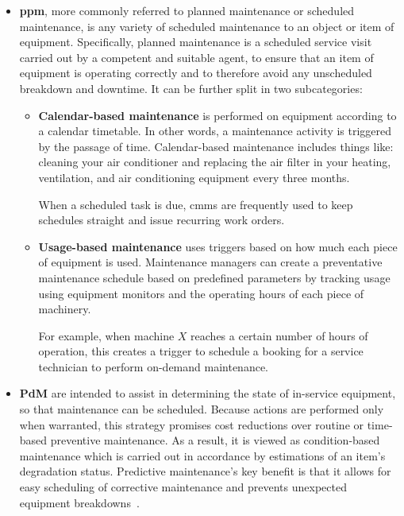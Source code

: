 \begin{itemize}
    \item \textbf{\ac{ppm}}, more commonly referred to planned maintenance
          or scheduled maintenance, is any variety of scheduled maintenance to an object or item of equipment. Specifically, planned maintenance is
          a scheduled service visit carried out by a competent and suitable agent, to ensure that an item of equipment is operating correctly and to
          therefore avoid any unscheduled breakdown and downtime. It can be further split in two subcategories:
          \begin{itemize}
              \item \textbf{Calendar-based maintenance} is performed on equipment according to a calendar timetable.
                    In other words, a maintenance activity is triggered by the passage of time.
                    Calendar-based maintenance includes things like: cleaning your air conditioner and replacing the air filter in your heating,
                    ventilation, and air conditioning equipment every three months.

                    When a scheduled task is due, \ac{cmms} are frequently used to keep schedules straight and issue recurring work orders.
              \item \textbf{Usage-based maintenance} uses triggers based on how much each piece of equipment is used.
                    Maintenance managers can create a preventative maintenance schedule based on predefined parameters by tracking usage
                    using equipment monitors and the operating hours of each piece of machinery.

                    For example, when machine $X$ reaches a certain number of hours of operation, this creates a trigger
                    to schedule a booking for a service technician to perform on-demand maintenance.
          \end{itemize}
    \item \textbf{\ac{PdM}} are intended to assist in determining the state of in-service equipment, so that maintenance can be scheduled.
          Because actions are performed only when warranted, this strategy promises cost reductions over routine or time-based preventive maintenance.
          As a result, it is viewed as condition-based maintenance which is carried out in accordance by estimations of an item's degradation status.
          Predictive maintenance's key benefit is that it allows for easy scheduling of corrective maintenance and prevents unexpected equipment breakdowns~\cite{Misc:danielpenn_2020_what}.


\end{itemize}
